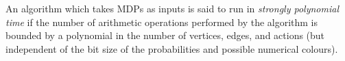 \begin{definition}
An algorithm which takes MDPs as inputs is said to run in \emph{strongly polynomial time} if the number of arithmetic 
	operations performed by the algorithm is bounded by a polynomial in the number 
	of vertices, edges, and actions (but independent of the bit size of the 
	probabilities and possible numerical colours). 
\end{definition}


%
